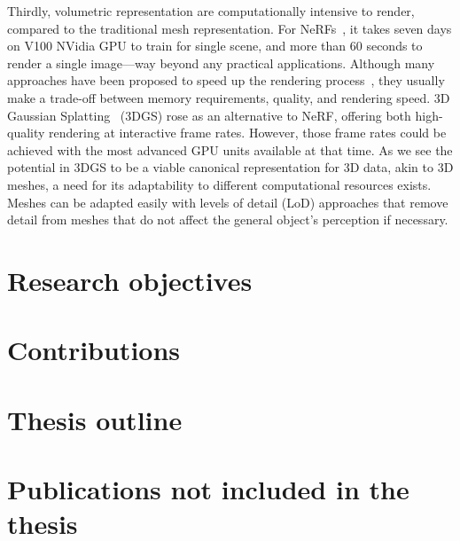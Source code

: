   Thirdly, volumetric representation are computationally intensive to render,
  compared to the traditional mesh representation.
  For NeRFs~\cite{mildenhall2020nerf}, it takes seven days on V100 NVidia GPU to
  train for single scene, and more than 60 seconds to render a single
  image---way beyond any practical applications.
  Although many approaches have been proposed to speed up the rendering
  process~\cite{garbin2021fastnerf,yu2021plenoctrees,reiser2021kilonerf,hedman2021baking,mueller2022instant},
  they usually make a trade-off between memory requirements, quality, and
  rendering speed.
  3D Gaussian Splatting~\cite{kerbl20233d} (3DGS) rose as an alternative to NeRF, offering both high-quality rendering at interactive frame rates.
  However, those frame rates could be achieved with the most advanced GPU units
  available at that time.
  As we see the potential in 3DGS to be a viable canonical representation for 3D
  data, akin to 3D meshes, a need for its adaptability to different
  computational resources exists.
  Meshes can be adapted easily with levels of detail (LoD) approaches that
  remove detail from meshes that do not affect the general object's perception
  if necessary.


\section{Research objectives}

\section{Contributions}

\section{Thesis outline}

\section{Publications not included in the thesis}





